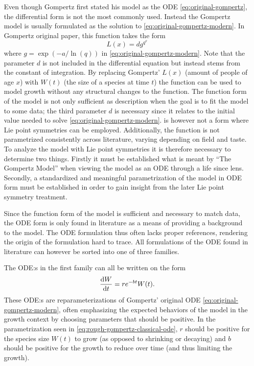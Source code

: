 Even though Gompertz first stated his model as the ODE \ref{eq:original-gompertz}, the differential form is not the most commonly used.
Instead the Gompertz model is usually formulated as the solution to \cref{eq:original-gompertz-modern}.
In Gompertz original paper, this function takes the form
\begin{equation} \label{eq:original-gompertz-solution}
  L(x) = d g^{q^x}
\end{equation}
where \(g = \exp(-a/\ln(q))\) in \cref{eq:original-gompertz-modern}.
Note that the parameter \(d\) is not included in the differential equation but instead stems from the constant of integration.
By replacing Gompertz' \(L(x)\) (amount of people of age \(x\)) with \(W(t)\) (the size of a species at time \(t\)) the function can be used to model growth without any structural changes to the function.
The function form of the model is not only sufficient as description when the goal is to fit the model to some data; the third parameter \(d\) is necessary since it relates to the initial value needed to solve \cref{eq:original-gompertz-modern}.
 is however not a form where Lie point symmetries can be employed.
Additionally, the function is not parametrized consistently across literature, varying depending on field and taste.
To analyze the model with Lie point symmetries it is therefore necessary to determine two things.
Firstly it must be established what is meant by \enquote{The Gompertz Model} when viewing the model as an ODE through a life since lens.
Secondly, a standardized and meaningful parametrization of the model in ODE form must be established in order to gain insight from the later Lie point symmetry treatment.

Since the function form of the model is sufficient and necessary to match data, the ODE form is only found in literature as a means of providing a background to the model.
The ODE formulation thus often lacks proper references, rendering the origin of the formulation hard to trace.
All formulations of the ODE found in literature can however be sorted into one of three families.

The ODE:s in the first family can all be written on the form
\begin{equation} \label{eq:rough-gompertz-classical-ode}
  \dv{W}{t} = r e^{-b t} W(t).
\end{equation}
These ODE:s are reparameterizations of Gompertz' original ODE \ref{eq:original-gompertz-modern}, often emphasizing the expected behaviors of the model in the growth context by choosing parameters that should be positive.
In the parametrization seen in \cref{eq:rough-gompertz-classical-ode}, \(r\) should be positive for the species size \(W(t)\) to grow (as opposed to shrinking or decaying) and \(b\) should be positive for the growth to reduce over time (and thus limiting the growth).

